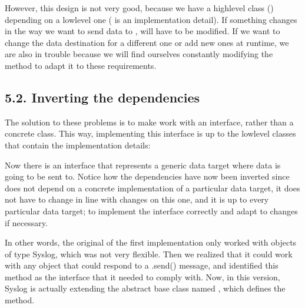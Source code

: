 \documentclass[a4paper,10pt,english]{sphinxmanual}
\begin{document}
\begin{figure}[H]
\centering

\noindent{}
\end{figure}

However, this design is not very good, because we have a high\sphinxhyphen{}level class
() depending on a low\sphinxhyphen{}level one ( is an implementation detail). If
something changes in the way we want to send data to ,  will have
to be modified. If we want to change the data destination for a different one or add new
ones at runtime, we are also in trouble because we will find ourselves constantly modifying
the  method to adapt it to these requirements.


\subsection{5.2. Inverting the dependencies}
\label{\detokenize{chapters/4_solid_principles/index:inverting-the-dependencies}}
The solution to these problems is to make  work with an interface, rather
than a concrete class. This way, implementing this interface is up to the low\sphinxhyphen{}level classes
that contain the implementation details:

\begin{figure}[H]
\centering

\noindent{}
\end{figure}

Now there is an interface that represents a generic data target where data is going to be sent
to. Notice how the dependencies have now been inverted since  does not
depend on a concrete implementation of a particular data target, it does not have to change
in line with changes on this one, and it is up to every particular data target; to implement
the interface correctly and adapt to changes if necessary.

In other words, the original  of the first implementation only worked with
objects of type Syslog, which was not very flexible. Then we realized that it could work
with any object that could respond to a .send() message, and identified this method as the
interface that it needed to comply with. Now, in this version, Syslog is actually extending
the abstract base class named , which defines the  method.
\end{document}
